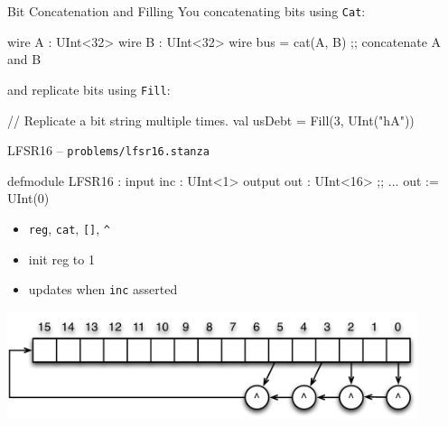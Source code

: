 \documentclass[xcolor=pdflatex,dvipsnames,table]{beamer}
\begin{document}
% 
% 

\begin{frame}[fragile]{Bit Concatenation and Filling}
You concatenating bits using \verb+Cat+:
\begin{stanza}
wire A   : UInt<32>
wire B   : UInt<32>
wire bus = cat(A, B) ;; concatenate A and B
\end{stanza}

and replicate bits using \verb+Fill+:
\begin{stanza}
// Replicate a bit string multiple times.
val usDebt = Fill(3, UInt("hA")) 
\end{stanza}

\end{frame}

\begin{frame}[fragile]{LFSR16 -- \tt problems/lfsr16.stanza}

\begin{stanza}
defmodule LFSR16 :
  input inc : UInt<1>
  output out : UInt<16>
  ;; ...
  out := UInt(0)
\end{stanza}
\begin{itemize}
\item \verb+reg+, \verb+cat+, \verb+[]+, \verb+^+
\item init reg to 1
\item updates when \verb+inc+ asserted
\end{itemize}

\begin{center}
\includegraphics[width=0.9\textwidth]{figs/LFSR16.pdf}
\end{center}

\end{frame}
\end{document}
